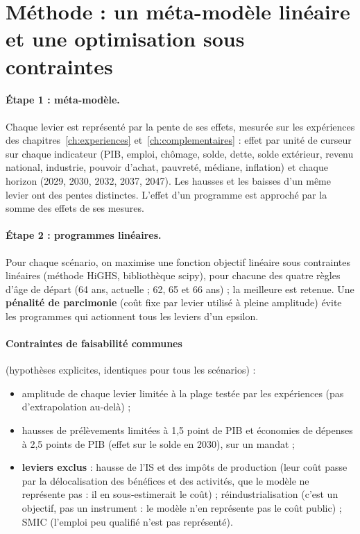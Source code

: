 \section{Méthode : un méta-modèle linéaire et une optimisation sous contraintes}

\paragraph{Étape 1 : méta-modèle.} Chaque levier est représenté par la pente de ses effets, mesurée sur les expériences
des chapitres~\ref{ch:experiences} et~\ref{ch:complementaires} : effet par unité de curseur sur chaque indicateur (PIB,
emploi, chômage, solde, dette, solde extérieur, revenu national, industrie, pouvoir d'achat, pauvreté, médiane, inflation)
et chaque horizon (2029, 2030, 2032, 2037, 2047). Les hausses et les baisses d'un même levier ont des pentes distinctes.
L'effet d'un programme est approché par la somme des effets de ses mesures.

\paragraph{Étape 2 : programmes linéaires.} Pour chaque scénario, on maximise une fonction objectif linéaire sous
contraintes linéaires (méthode HiGHS, bibliothèque scipy), pour chacune des quatre règles d'âge de départ (64 ans,
actuelle ; 62, 65 et 66 ans) ; la meilleure est retenue. Une \textbf{pénalité de parcimonie} (coût fixe par levier
utilisé à pleine amplitude) évite les programmes qui actionnent tous les leviers d'un epsilon.

\paragraph{Contraintes de faisabilité communes} (hypothèses explicites, identiques pour tous les scénarios) :
\begin{itemize}
\item amplitude de chaque levier limitée à la plage testée par les expériences (pas d'extrapolation au-delà) ;
\item hausses de prélèvements limitées à 1,5 point de PIB et économies de dépenses à 2,5 points de PIB (effet sur le
solde en 2030), sur un mandat ;
\item \textbf{leviers exclus} : hausse de l'IS et des impôts de production (leur coût passe par la délocalisation des
bénéfices et des activités, que le modèle ne représente pas : il en sous-estimerait le coût) ; réindustrialisation
(c'est un objectif, pas un instrument : le modèle n'en représente pas le coût public) ; SMIC (l'emploi peu qualifié n'est
pas représenté).
\end{itemize}

